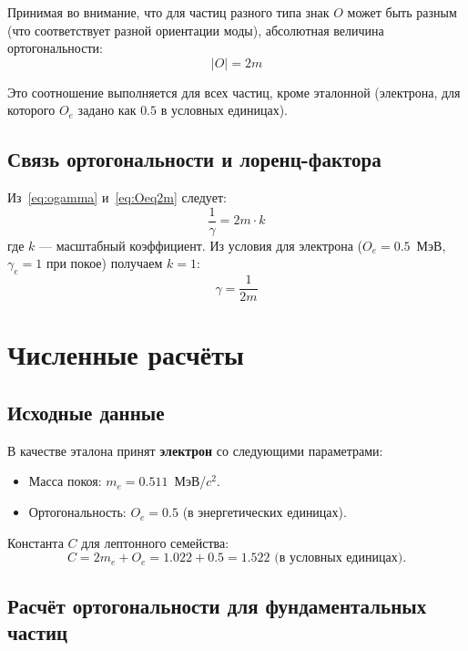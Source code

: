 \documentclass[12pt,a4paper]{article}
\begin{document}
Принимая во внимание, что для частиц разного типа знак $O$ может быть разным (что соответствует разной ориентации моды), абсолютная величина ортогональности:
\begin{equation}
    \boxed{|O| = 2m}
    \label{eq:Oeq2m}
\end{equation}

Это соотношение выполняется для всех частиц, кроме эталонной (электрона, для которого $O_e$ задано как $0.5$ в условных единицах).

\subsection{Связь ортогональности и лоренц-фактора}
Из~\eqref{eq:ogamma} и~\eqref{eq:Oeq2m} следует:
\begin{equation}
    \frac{1}{\gamma} = 2m \cdot k
\end{equation}
где $k$ --- масштабный коэффициент. Из условия для электрона ($O_e = 0.5$~МэВ, $\gamma_e = 1$ при покое) получаем $k = 1$:
\begin{equation}
    \boxed{\gamma = \frac{1}{2m}}
    \label{eq:gammafromm}
\end{equation}

\section{Численные расчёты}

\subsection{Исходные данные}
В качестве эталона принят \textbf{электрон} со следующими параметрами:
\begin{itemize}
    \item Масса покоя: $m_e = 0.511$~МэВ/$c^2$.
    \item Ортогональность: $O_e = 0.5$ (в энергетических единицах).
\end{itemize}

Константа $C$ для лептонного семейства:
\begin{equation}
    C = 2m_e + O_e = 1.022 + 0.5 = 1.522 \text{ (в условных единицах)}.
\end{equation}

\subsection{Расчёт ортогональности для фундаментальных частиц}
\end{document}
